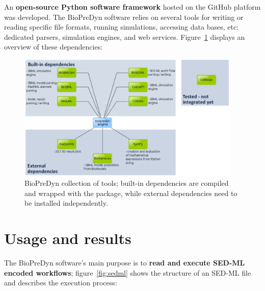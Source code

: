 \documentclass[17pt,portrait,a1,usenames,dvipsnames,plainboxedsections]{sciposter}
\begin{document}
\begin{multicols}{2}
An {\bf open-source Python software framework} hosted on the GitHub platform
was developed. The BioPreDyn software relies on several tools for writing or
reading specific file formats, running simulations, accessing data bases, etc:
dedicated parsers, simulation engines, and web services. Figure~\ref{fig:tools}
displays an overview of these dependencies:

\begin{figure}
\centering
\includegraphics[width=0.95\textwidth]{biopredyn_modules_3.pdf}
\caption{BioPreDyn collection of tools; built-in dependencies are compiled
and wrapped with the package, while external dependencies need to be
installed independently.}
\label{fig:tools}
\end{figure}

\section{Usage and results}
The BioPreDyn software's main purpose is to {\bf read and execute SED-ML
encoded workflows}; figure~\ref{fig:sedml} shows the structure of an SED-ML
file and describes the execution process:


\end{multicols}
\end{document}
